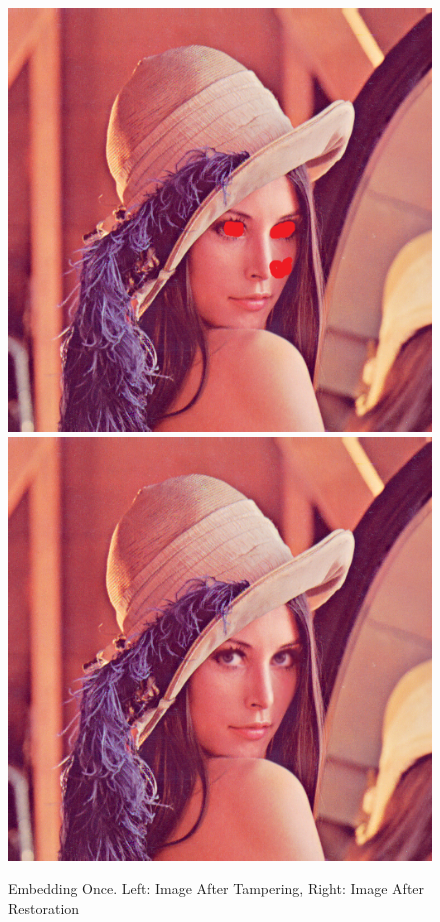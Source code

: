 \documentclass[12pt]{article}
\begin{document}
\begin{figure}[h]
\centerline{%
\includegraphics[scale=0.45]{"Lena Embed once 0.7 threshold/finalImage - Copy"}%
\hspace{0.1cm}
\includegraphics[scale=0.45]{"Lena Embed once 0.7 threshold/finalImageAfterRestoration"}%
}%
\caption{Embedding Once. Left: Image After Tampering, Right: Image After Restoration}
\label{fig:lenaEmbedOnceRestoration}
\end{figure}
\end{document}
